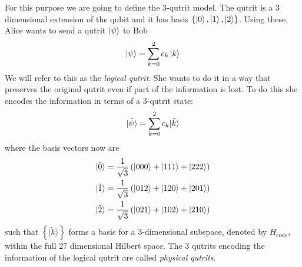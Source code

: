 \documentclass[letter,12pt]{article}
\begin{document}
For this purpose we are going to define the 3-qutrit model. The qutrit is a 3 dimensional extension of the qubit and it has basis $\{\ket{0},\ket{1},\ket{2}\}$. Using these, Alice wants to send a qutrit $\ket{\psi}$ to Bob
\begin{equation}
	\begin{aligned}
		\ket{\psi}=\sum_{k=0}^{2}c_k \ket{k}
	\end{aligned}
\end{equation}
We will refer to this as the \textit{logical qutrit}. She wants to do it in a way that preserves the original qutrit even if part of the information is lost. To do this she encodes the information in terms of a 3-qutrit state:
\begin{equation}
	\begin{aligned}
		|\tilde \psi\rangle=\sum_{k=0}^{2}c_k \tilde{\ket{k}}
	\end{aligned}
\end{equation}
where the basis vectors now are
	\begin{equation} \label{eq:masslessSH}
		\begin{aligned}
			|\tilde 0\rangle &=\frac{1}{\sqrt{3}}\left(\ket{000}+\ket{111}+\ket{222}\right)\\
			|\tilde 1\rangle &=\frac{1}{\sqrt{3}}\left(\ket{012}+\ket{120}+\ket{201}\right)\\
			|\tilde 2\rangle &=\frac{1}{\sqrt{3}}\left(\ket{021}+\ket{102}+\ket{210}\right)\\
		\end{aligned}
	\end{equation}
such that $\left\{|\tilde k\rangle\right\}$ forms a basis for a 3-dimensional subspace, denoted by $H_{\text{code}}$, within the full 27 dimensional Hilbert space. The 3 qutrits encoding the information of the logical qutrit are called \textit{physical qutrits}. 
\end{document}
